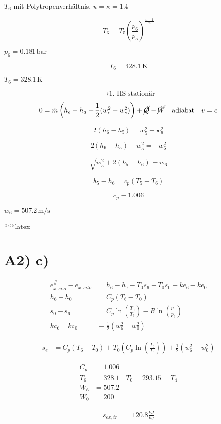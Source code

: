 $T_6$ mit Polytropenverhältnis, $n = \kappa = 1.4$

\[
T_6 = T_5 \left( \frac{p_6}{p_5} \right)^{\frac{n-1}{n}}
\]

$p_6 = 0.181 \, \text{bar}$

\[
T_6 = 328.1 \, \text{K}
\]

\underline{$T_6 = 328.1 \, \text{K}$}

\[
\rightarrow \text{1. HS stationär}
\]

\[
0 = \dot{m} \left( h_e - h_a + \frac{1}{2} (w_e^2 - w_a^2) \right) + \cancel{\dot{Q}} - \cancel{\dot{W}} \quad \text{adiabat} \quad v = c
\]

\[
2(h_6 - h_5) = w_5^2 - w_6^2
\]

\[
2(h_6 - h_5) - w_5^2 = -w_6^2
\]

\[
\sqrt{w_5^2 + 2(h_5 - h_6)} = w_6
\]

\[
h_5 - h_6 = c_p (T_5 - T_6)
\]

\[
c_p = 1.006
\]

\underline{$w_6 = 507.2 \, \text{m/s}$}

``````latex


\section*{A2) c)}

\begin{align*}
    e_{x,sito}^\# - e_{x,sito} &= h_6 - h_0 - T_0 s_6 + T_0 s_0 + ke_6 - ke_0 \\
    h_6 - h_0 &= C_p (T_6 - T_0) \\
    s_0 - s_6 &= C_p \ln \left( \frac{T_0}{T_6} \right) - R \ln \left( \frac{p_0}{p_6} \right) \\
    ke_6 - ke_0 &= \frac{1}{2} (w_6^2 - w_0^2)
\end{align*}

\begin{align*}
    s_e &= C_p (T_6 - T_0) + T_0 \left( C_p \ln \left( \frac{T_0}{T_6} \right) \right) + \frac{1}{2} (w_6^2 - w_0^2)
\end{align*}

\begin{align*}
    C_p &= 1.006 \\
    T_6 &= 328.1 \quad T_0 = 293.15 = T_4 \\
    W_6 &= 507.2 \\
    W_0 &= 200
\end{align*}

\begin{align*}
    s_{ex,tr} &= 120.8 \frac{kJ}{kg}
\end{align*}

